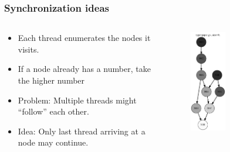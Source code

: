 \begin{frame}
\frametitle{Synchronization ideas}
\begin{columns}
  \begin{column}{0.5\textwidth}
    \begin{itemize}
            \item Each thread enumerates the nodes it visits.
            \item If a node already has a number, take the higher number
    \end{itemize}
    \vspace{0.3cm}
    \begin{itemize}
            \item Problem: Multiple threads might ``follow'' each other.
            \item Idea: Only last thread arriving at a node may continue.
    \end{itemize}
  \end{column}
%   
  \begin{column}{0.5\textwidth}
    \begin{figure}[ht]
    \includegraphics[width=0.4\textwidth]{paper.png}
    \end{figure}
  \end{column}
\end{columns}
\end{frame}

